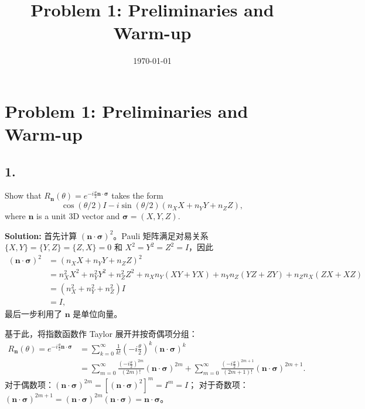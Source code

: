 \documentclass{ctexart}
\title{Problem 1: Preliminaries and Warm-up}
\author{}
\date{\today}
\begin{document}
\maketitle

\section*{Problem 1: Preliminaries and Warm-up}

\subsection*{1.}
Show that $R_{\mathbf{n}}(\theta) = e^{-i\frac{\theta}{2}\mathbf{n}\cdot\boldsymbol{\sigma}}$ takes the form
\begin{equation}
    \cos(\theta/2)I - i\sin(\theta/2)(n_X X + n_Y Y + n_Z Z),
\end{equation}
where $\mathbf{n}$ is a unit 3D vector and $\boldsymbol{\sigma} = (X, Y, Z)$.

\medskip
\noindent\textbf{Solution:}
首先计算 $(\mathbf{n}\cdot\boldsymbol{\sigma})^2$。Pauli 矩阵满足对易关系
$\{X,Y\} = \{Y,Z\} = \{Z,X\} = 0$ 和 $X^2 = Y^2 = Z^2 = I$，因此
\begin{align*}
    (\mathbf{n}\cdot\boldsymbol{\sigma})^2
    &= (n_X X + n_Y Y + n_Z Z)^2 \\
    &= n_X^2 X^2 + n_Y^2 Y^2 + n_Z^2 Z^2
       + n_X n_Y (XY+YX) + n_Y n_Z (YZ+ZY) + n_Z n_X (ZX+XZ) \\
    &= (n_X^2 + n_Y^2 + n_Z^2) I \\
    &= I,
\end{align*}
最后一步利用了 $\mathbf{n}$ 是单位向量。

基于此，将指数函数作 Taylor 展开并按奇偶项分组：
\begin{align*}
    R_{\mathbf{n}}(\theta) = e^{-i\frac{\theta}{2}\mathbf{n}\cdot\boldsymbol{\sigma}}
    &= \sum_{k=0}^{\infty} \frac{1}{k!} \left(-i\frac{\theta}{2}\right)^k (\mathbf{n}\cdot\boldsymbol{\sigma})^k \\
    &= \sum_{m=0}^{\infty} \frac{(-i\frac{\theta}{2})^{2m}}{(2m)!} (\mathbf{n}\cdot\boldsymbol{\sigma})^{2m}
       + \sum_{m=0}^{\infty} \frac{(-i\frac{\theta}{2})^{2m+1}}{(2m+1)!} (\mathbf{n}\cdot\boldsymbol{\sigma})^{2m+1}.
\end{align*}
对于偶数项：$(\mathbf{n}\cdot\boldsymbol{\sigma})^{2m} = [(\mathbf{n}\cdot\boldsymbol{\sigma})^2]^m = I^m = I$；
对于奇数项：$(\mathbf{n}\cdot\boldsymbol{\sigma})^{2m+1} = (\mathbf{n}\cdot\boldsymbol{\sigma})^{2m}(\mathbf{n}\cdot\boldsymbol{\sigma}) = \mathbf{n}\cdot\boldsymbol{\sigma}$。
\end{document}
